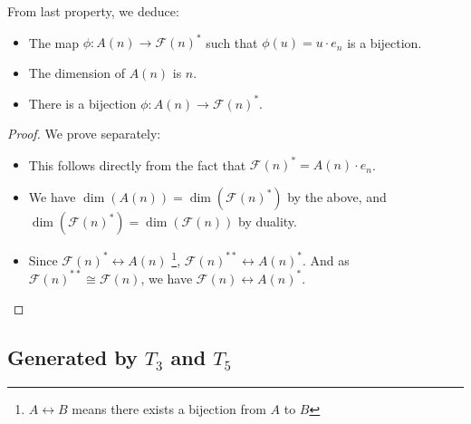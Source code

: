 \begin{corollary}
	From last property, we deduce:
	\begin{itemize}
		\item The map $\phi: A(n) \to \mathcal{F}(n)^*$ such that $\phi(u) = u \cdot e_n$ is a bijection.
		\item The dimension of $A(n)$ is $n$.
		\item There is a bijection $\phi: A(n) \to \mathcal{F}(n)^*$.
	\end{itemize}
\end{corollary}
\begin{proof}
	We prove separately:
	\begin{itemize}
		\item This follows directly from the fact that $\mathcal{F}(n)^* = A(n) \cdot e_n$.
		\item We have $\dim(A(n)) = \dim(\mathcal{F}(n)^*)$ by the above, and $\dim(\mathcal{F}(n)^*) = \dim(\mathcal{F}(n))$ by duality.
		\item Since $\mathcal{F}(n)^* \leftrightarrow A(n)$
		\footnote{$A \leftrightarrow B$ means there exists a bijection from $A$ to $B$}, $\mathcal{F}(n)^{**} \leftrightarrow A(n)^*$.
		And as $\mathcal{F}(n)^{**} \cong \mathcal{F}(n)$, we have $\mathcal{F}(n) \leftrightarrow A(n)^*$.
	\end{itemize}
\end{proof}



\subsection{Generated by $T_3$ and $T_5$}





